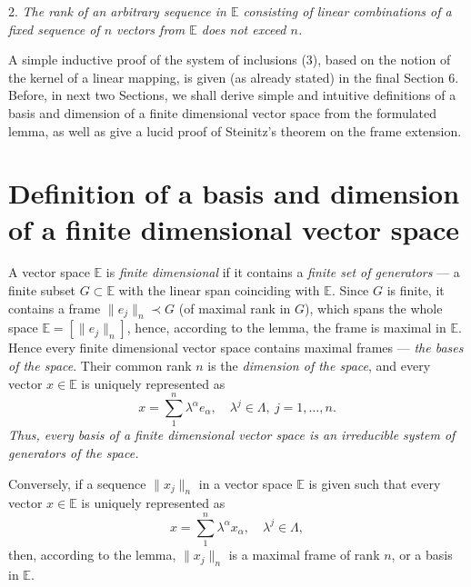 \documentclass[]{amsart}
\begin{document}
2. \emph{The rank of an arbitrary sequence  in $\mathbb E$  consisting of linear combinations of a fixed sequence of $n$ vectors from $\mathbb E$ does not exceed $n$.}

\noindent
A simple inductive proof of the system of inclusions (3), based on the notion of the kernel of a linear mapping, is given (as already stated)    in the final Sec\-tion 6. Before, in next two Sections, we shall derive    
simple and intuitive definitions of    a basis and dimension of a finite dimensional vector space
{from the formulated lemma}, 
as well as give a lucid   proof of   Steinitz's  theorem on the  frame extension.






\section{Definition of a basis and dimension of a finite dimensional vec\-tor space} 
A vector space $\mathbb E$ is \emph{finite dimensional} if it contains a \emph{finite set of generators} --- a finite subset $G\subset\mathbb E$  with the linear span coinciding with $\mathbb E$.   
Since $G$ is finite, it contains a   frame $\|e_j\|_n\prec G$ (of maximal rank in $G$), which spans the whole space $\mathbb E=[\|e_j\|_n]$, hence, according to the lemma, the frame is maximal in $\mathbb E$.
Hence every finite dimensional vector space contains maximal frames --- \emph{the bases of the space}.
Their common rank $n$ is the \emph{dimension of the space}, and every vector $x\in\mathbb E$ 
is uniquely represented as
\[
x=\sum_1^n\lambda^\alpha e_\alpha,\quad \lambda^j\in\Lambda,\ j=1,\ldots,n.
\]
\emph{Thus, every basis of a finite dimensional vector space is an irreducible system of generators of the space.}

Conversely, if a sequence $\|x_j\|_n$ in a vector space $\mathbb E$ is given such that every vector  
$x\in\mathbb E$ is uniquely represented as
\[
x=\sum_1^n\lambda^\alpha x_\alpha,\quad \lambda^j\in\Lambda, 
\]
then, according to the lemma, $\|x_j\|_n$ is a maximal frame of rank $n$, or a basis  in $\mathbb E$.

\end{document}
